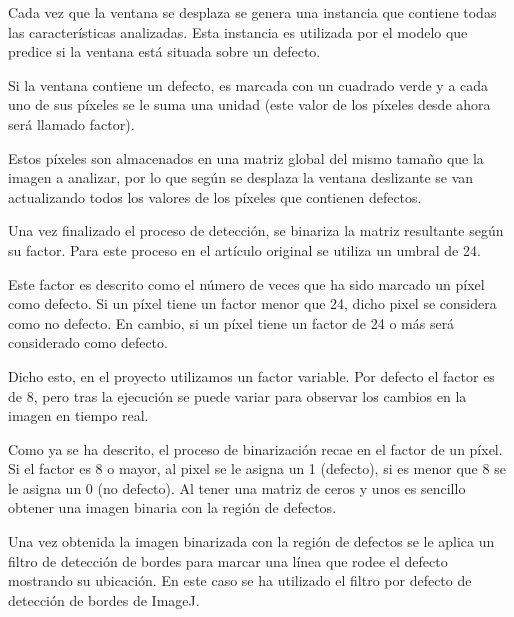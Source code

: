 Cada vez que la ventana se desplaza se genera una instancia que contiene todas las características analizadas. Esta instancia es utilizada por el modelo que predice si la ventana está situada sobre un defecto.

Si la ventana contiene un defecto, es marcada con un cuadrado verde y a cada uno de sus píxeles se le suma una unidad (este valor de los píxeles desde ahora será llamado factor).

Estos píxeles son almacenados en una matriz global del mismo tamaño que la imagen a analizar, por lo que según se desplaza la ventana deslizante se van actualizando todos los valores de los píxeles que contienen defectos.

Una vez finalizado el proceso de detección, se binariza la matriz resultante según su factor. Para este proceso en el artículo original \cite{DomingoMery} se utiliza un umbral de 24.

Este factor es descrito como el número de veces que ha sido marcado un píxel como defecto. Si un píxel tiene un factor menor que 24, dicho pixel se considera como no defecto. En cambio, si un píxel tiene un factor de 24 o más será considerado como defecto.

Dicho esto, en el proyecto utilizamos un factor variable. Por defecto el factor es de 8, pero tras la ejecución se puede variar para observar los cambios en la imagen en tiempo real.

Como ya se ha descrito, el proceso de binarización recae en el factor de un píxel. Si el factor es 8 o mayor, al pixel se le asigna un 1 (defecto), si es menor que 8 se le asigna un 0 (no defecto). Al tener una matriz de ceros y unos es sencillo obtener una imagen binaria con la región de defectos.


Una vez obtenida la imagen binarizada con la región de defectos se le aplica un filtro de detección de bordes para marcar una línea que rodee el defecto mostrando su ubicación. En este caso se ha utilizado el filtro por defecto de detección de bordes de ImageJ.

